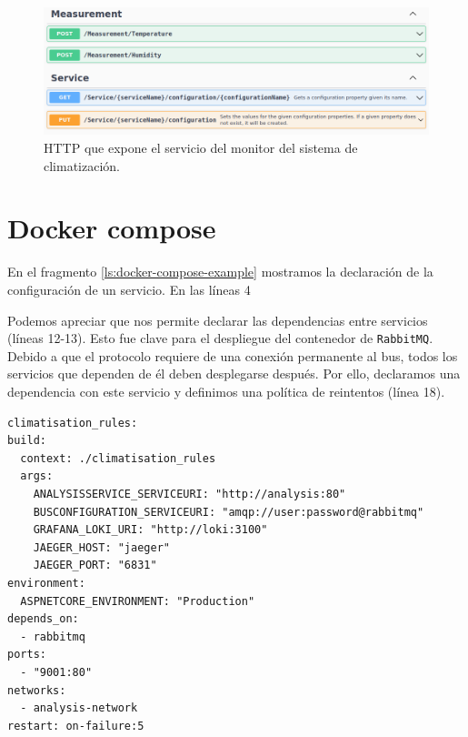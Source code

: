 \begin{figure}[h!]
  \hspace{-0.25cm}
  \includegraphics[scale=0.45]{anx_apis/images/apis-room-monitor}
  \caption{ HTTP que expone el servicio del monitor del sistema de climatización.}
\end{figure}

\chapter{Docker compose}

En el fragmento \ref{ls:docker-compose-example} mostramos la declaración de la configuración de un servicio. En las líneas 4

Podemos apreciar que nos permite declarar las dependencias entre servicios (líneas 12-13). Esto fue clave para el despliegue del contenedor de \texttt{RabbitMQ}. Debido a que el protocolo requiere de una conexión permanente al bus\cite{johanssonPartRabbitMQBest2019}, todos los servicios que dependen de él deben desplegarse después. Por ello, declaramos una dependencia con este servicio y definimos una política de reintentos (línea 18).

\begin{lstlisting}[style=yaml,caption={Ejemplo de declaración de despliegue de un servicio en Docker Compose},captionpos=b, label=ls:docker-compose-example]
climatisation_rules:
build:
  context: ./climatisation_rules
  args:
    ANALYSISSERVICE_SERVICEURI: "http://analysis:80"
    BUSCONFIGURATION_SERVICEURI: "amqp://user:password@rabbitmq"
    GRAFANA_LOKI_URI: "http://loki:3100"
    JAEGER_HOST: "jaeger"
    JAEGER_PORT: "6831"
environment:
  ASPNETCORE_ENVIRONMENT: "Production"
depends_on:
  - rabbitmq
ports:
  - "9001:80"
networks:
  - analysis-network
restart: on-failure:5
  \end{lstlisting}
